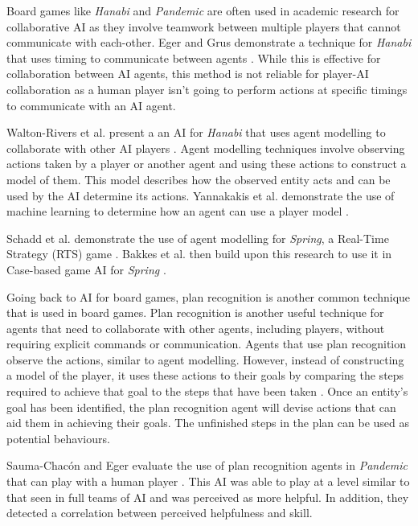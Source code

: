 \documentclass{IEEEtran}
\begin{document}
Board games like \textit{Hanabi} and \textit{Pandemic} are often used in academic research for collaborative AI as they involve teamwork between multiple players that cannot communicate with each-other. Eger and Grus demonstrate a technique for \textit{Hanabi} that uses timing to communicate between agents \cite{WaitASecond2019}. While this is effective for collaboration between AI agents, this method is not reliable for player-AI collaboration as a human player isn't going to perform actions at specific timings to communicate with an AI agent.

Walton-Rivers et al. present a an AI for \textit{Hanabi} that uses agent modelling to collaborate with other AI players \cite{EvaluatingHanabiAgents}. Agent modelling techniques involve observing actions taken by a player or another agent and using these actions to construct a model of them. This model describes how the observed entity acts and can be used by the AI determine its actions. Yannakakis et al. demonstrate the use of machine learning to determine how an agent can use a player model \cite{yannakakis2013playermodelling}.

Schadd et al. demonstrate the use of agent modelling for \textit{Spring}, a Real-Time Strategy (RTS) game \cite{OpponentModellingRTS2007}. Bakkes et al. then build upon this research to use it in Case-based game AI for \textit{Spring} \cite{bakkes2009opponentmodelling}.


Going back to AI for board games, plan recognition is another common technique that is used in board games. Plan recognition is another useful technique for agents that need to collaborate with other agents, including players, without requiring explicit commands or communication. Agents that use plan recognition observe the actions, similar to agent modelling. However, instead of constructing a model of the player, it uses these actions to their goals by comparing the steps required to achieve that goal to the steps that have been taken \cite{GeneratingCollabBehaviourPlanRecognition2016}. Once an entity’s goal has been identified, the plan recognition agent will devise actions that can aid them in achieving their goals. The unfinished steps in the plan can be used as potential behaviours.

Sauma-Chacón and Eger evaluate the use of plan recognition agents in \textit{Pandemic} that can play with a human player \cite{PandemicPlanRecognition2021}. This AI was able to play at a level similar to that seen in full teams of AI and was perceived as more helpful. In addition, they detected a correlation between perceived helpfulness and skill.
\end{document}
